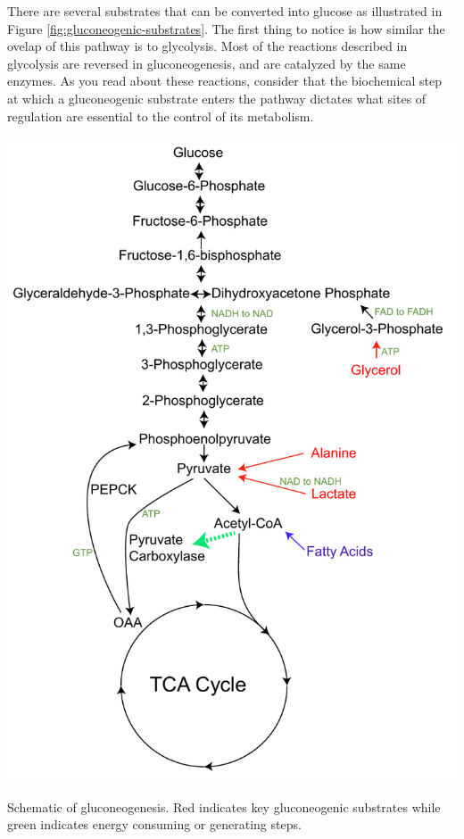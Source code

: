 \documentclass{tufte-handout}
\begin{document}
There are several substrates that can be converted into glucose as illustrated in Figure \ref{fig:gluconeogenic-substrates}.  The first thing to notice is how similar the ovelap of this pathway is to glycolysis.  Most of the reactions described in glycolysis are reversed in gluconeogenesis, and are catalyzed by the same enzymes.  As you read about these reactions, consider that the biochemical step at which a gluconeogenic substrate enters the pathway dictates what sites of regulation are essential to the control of its metabolism.  

\begin{marginfigure}
\includegraphics{figures/gluconeogenic-substrates.pdf}
\caption{Schematic of gluconeogenesis.  Red indicates key gluconeogenic substrates while green indicates energy consuming or generating steps.}
\label{fig:gluconeogenic-substrates}
\end{marginfigure}
\end{document}
